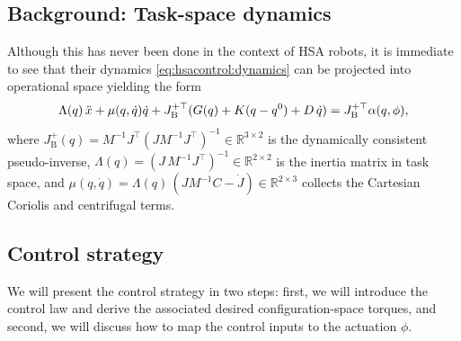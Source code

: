 \subsection{Background: Task-space dynamics}\label{sub:hsacontrol:task_space_dynamics}
%
Although this has never been done in the context of HSA robots, it is immediate to see that their dynamics \eqref{eq:hsacontrol:dynamics} can be projected into operational space yielding the form~\citep{della2019exact, della2020model} %
\begin{equation}\label{eq:hsacontrol:operational_space_dynamics}
    \Lambda(q) \, \Ddot{x} + \mu(q,\dot{q}) \dot{q} + J_\mathrm{B}^{+\top} ( G(q) + K (q-q^0) + D \, \dot{q} ) = J_\mathrm{B}^{+\top} \alpha(q,\phi),
\end{equation}
where $J_\mathrm{B}^+(q) = M^{-1} J^\top(J M^{-1} J^\top)^{-1} \in \mathbb{R}^{3\times2}$ is the dynamically consistent pseudo-inverse, $\Lambda(q) = (J \, M^{-1} J^\top)^{-1} \in \mathbb{R}^{2 \times 2}$ is the inertia matrix in task space, and $\mu(q, \dot{q}) = \Lambda(q) \, (J M^{-1} C - \dot{J}) \in \mathbb{R}^{2 \times 3}$ collects the Cartesian Coriolis and centrifugal terms. %

\subsection{Control strategy}\label{sub:hsacontrol:task_space_impedance_control:control_strategy}
%
We will present the control strategy in two steps: first, we will introduce the control law and derive the associated desired configuration-space torques, and second, we will discuss how to map the control inputs to the actuation $\phi$.

